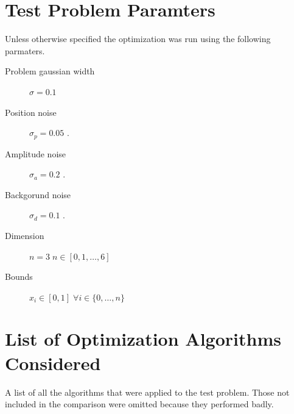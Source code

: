 \documentclass[a4paper,titlepage]{report}
\begin{document}
\section{Test Problem Paramters}
\label{sec:param}

Unless otherwise specified the optimization was run using the following parmaters.

\begin{description}
\item[Problem gaussian width] $\sigma   = 0.1 $ 
\item[Position noise]         $\sigma_p = 0.05$ .
\item[Amplitude noise]        $\sigma_a = 0.2 $ .
\item[Backgorund noise]       $\sigma_d = 0.1 $ .
\item[Dimension]           $n=3\; n \in [0,1,\dots,6]$
\item[Bounds]              $x_i \in [0,1]\; \forall i \in \{0,\dots,n\}$
\end{description}


\section{List of Optimization Algorithms Considered}

A list of all the algorithms that were applied to the test problem. Those not included in the comparison were omitted because they performed badly.
\end{document}
